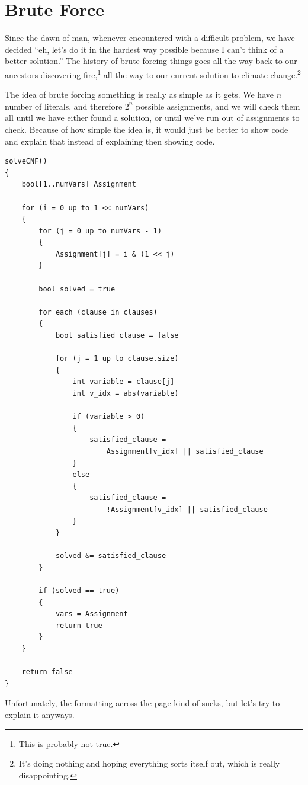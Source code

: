 \chapter{Brute Force}

Since the dawn of man, whenever encountered with a difficult problem, we have
decided ``eh, let's do it in the hardest way possible because I can't think of a
better solution.'' The history of brute forcing things goes all the way back to
our ancestors discovering fire,\footnote{This is probably not true.} all the way
to our current solution to climate change.\footnote{It's doing nothing and hoping
everything sorts itself out, which is really disappointing.}

The idea of brute forcing something is really as simple as it gets. We have $n$
number of literals, and therefore $2^n$ possible assignments, and we will check
them all until we have either found a solution, or until we've run out of
assignments to check. Because of how simple the idea is, it would just be
better to show code and explain that instead of explaining then showing code.

\begin{lstlisting}
solveCNF()
{
    bool[1..numVars] Assignment

    for (i = 0 up to 1 << numVars)
    {
        for (j = 0 up to numVars - 1)
        {
            Assignment[j] = i & (1 << j)
        }

        bool solved = true

        for each (clause in clauses)
        {
            bool satisfied_clause = false

            for (j = 1 up to clause.size)
            {
                int variable = clause[j]
                int v_idx = abs(variable)

                if (variable > 0)
                {
                    satisfied_clause =
                        Assignment[v_idx] || satisfied_clause
                }
                else
                {
                    satisfied_clause =
                        !Assignment[v_idx] || satisfied_clause
                }
            }

            solved &= satisfied_clause
        }

        if (solved == true)
        {
            vars = Assignment
            return true
        }
    }

    return false
}
\end{lstlisting}

Unfortunately, the formatting across the page kind of sucks, but let's try to
explain it anyways.

